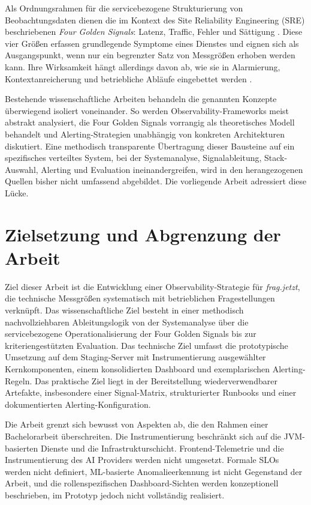 Als Ordnungsrahmen für die servicebezogene Strukturierung von Beobachtungsdaten dienen die im Kontext des Site Reliability Engineering (SRE) beschriebenen \emph{Four Golden Signals}: Latenz, Traffic, Fehler und Sättigung \parencite[S.~60]{ewaschukMonitoringDistributedSystems}. Diese vier Größen erfassen grundlegende Symptome eines Dienstes und eignen sich als Ausgangspunkt, wenn nur ein begrenzter Satz von Messgrößen erhoben werden kann. Ihre Wirksamkeit hängt allerdings davon ab, wie sie in Alarmierung, Kontextanreicherung und betriebliche Abläufe eingebettet werden \parencite[S.~63--64]{ewaschukMonitoringDistributedSystems}.

Bestehende wissenschaftliche Arbeiten behandeln die genannten Konzepte überwiegend isoliert voneinander. So werden Observability-Frameworks meist abstrakt analysiert, die Four Golden Signals vorrangig als theoretisches Modell behandelt und Alerting-Strategien unabhängig von konkreten Architekturen diskutiert. Eine methodisch transparente Übertragung dieser Bausteine auf ein spezifisches verteiltes System, bei der Systemanalyse, Signalableitung, Stack-Auswahl, Alerting und Evaluation ineinandergreifen, wird in den herangezogenen Quellen bisher nicht umfassend abgebildet. Die vorliegende Arbeit adressiert diese Lücke.


\section{Zielsetzung und Abgrenzung der Arbeit}
\label{sec:zielsetzung}

Ziel dieser Arbeit ist die Entwicklung einer Observability-Strategie für \emph{frag.jetzt}, die technische Messgrößen systematisch mit betrieblichen Fragestellungen verknüpft. Das wissenschaftliche Ziel besteht in einer methodisch nachvollziehbaren Ableitungslogik von der Systemanalyse über die servicebezogene Operationalisierung der Four Golden Signals bis zur kriteriengestützten Evaluation. Das technische Ziel umfasst die prototypische Umsetzung auf dem Staging-Server mit Instrumentierung ausgewählter Kernkomponenten, einem konsolidierten Dashboard und exemplarischen Alerting-Regeln. Das praktische Ziel liegt in der Bereitstellung wiederverwendbarer Artefakte, insbesondere einer Signal-Matrix, strukturierter Runbooks und einer dokumentierten Alerting-Konfiguration.

Die Arbeit grenzt sich bewusst von Aspekten ab, die den Rahmen einer Bachelorarbeit überschreiten. Die Instrumentierung beschränkt sich auf die JVM-basierten Dienste und die Infrastrukturschicht. Frontend-Telemetrie und die Instrumentierung des AI Providers werden nicht umgesetzt. Formale SLOs werden nicht definiert, ML-basierte Anomalieerkennung ist nicht Gegenstand der Arbeit, und die rollenspezifischen Dashboard-Sichten werden konzeptionell beschrieben, im Prototyp jedoch nicht vollständig realisiert.


